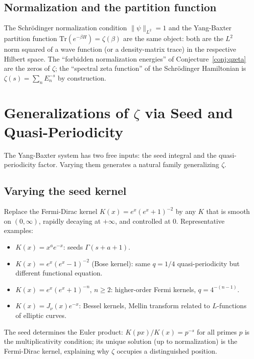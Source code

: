 \documentclass[%
 aip,
 amsmath,amssymb,
 reprint,%
]{revtex4-1}
\theoremstyle{plain}
\theoremstyle{definition}
\begin{document}
\subsection{Normalization and the partition function}

The Schr\"odinger normalization condition $\|\psi\|_{L^2} = 1$ and the
Yang-Baxter partition function $\mathrm{Tr}(e^{-\beta H}) = \zeta(\beta)$ are
the same object: both are the $L^2$ norm squared of a wave function
(or a density-matrix trace) in the respective Hilbert space.
The ``forbidden normalization energies'' of Conjecture~\ref{conj:qzeta}
are the zeros of $\zeta$; the ``spectral zeta function'' of the Schr\"odinger
Hamiltonian is $\zeta(s) = \sum_n E_n^{-s}$ by construction.

\section{Generalizations of $\zeta$ via Seed and Quasi-Periodicity}
\label{sec:generalizations}

The Yang-Baxter system has two free inputs: the seed integral and the
quasi-periodicity factor. Varying them generates a natural family generalizing $\zeta$.

\subsection{Varying the seed kernel}

Replace the Fermi-Dirac kernel $K(x) = e^x(e^x+1)^{-2}$ by any $K$ that is
smooth on $(0,\infty)$, rapidly decaying at $+\infty$, and controlled at $0$.
Representative examples:
\begin{itemize}
\item $K(x) = x^a e^{-x}$: seeds $\Gamma(s+a+1)$.
\item $K(x) = e^x(e^x-1)^{-2}$ (Bose kernel): same $q=1/4$ quasi-periodicity but
  different functional equation.
\item $K(x) = e^x(e^x+1)^{-n}$, $n \geq 2$: higher-order Fermi kernels,
  $q = 4^{-(n-1)}$.
\item $K(x) = J_\nu(x)e^{-x}$: Bessel kernels, Mellin transform related to
  $L$-functions of elliptic curves.
\end{itemize}

The seed determines the Euler product: $K(px)/K(x) = p^{-s}$ for all primes $p$
is the multiplicativity condition; its unique solution (up to normalization) is
the Fermi-Dirac kernel, explaining why $\zeta$ occupies a distinguished position.
\end{document}
